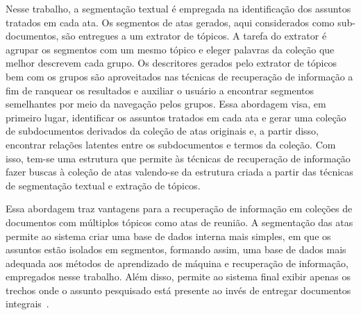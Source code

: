 Nesse trabalho, a segmentação textual é empregada na identificação dos assuntos tratados em cada ata. Os segmentos de atas gerados, aqui considerados como sub-documentos, são entregues a um extrator de tópicos. A tarefa do extrator é agrupar os segmentos com um mesmo tópico e eleger palavras da coleção que melhor descrevem cada grupo. Os descritores gerados pelo extrator de tópicos bem com os grupos são aproveitados nas técnicas de recuperação de informação a fim de ranquear os resultados e auxiliar o usuário a encontrar segmentos semelhantes por meio da navegação pelos grupos. Essa abordagem visa, em primeiro lugar, identificar os assuntos tratados em cada ata e gerar uma coleção de subdocumentos derivados da coleção de atas originais e, a partir disso, encontrar relações latentes entre os subdocumentos e termos da coleção. Com isso, tem-se uma estrutura que permite às técnicas de recuperação de informação fazer buscas à coleção de atas valendo-se da estrutura criada a partir das técnicas de segmentação textual e extração de tópicos. 









%
%
Essa abordagem traz vantagens para a recuperação de informação em coleções de documentos com múltiplos tópicos como atas de reunião.
A segmentação das atas permite ao sistema criar uma base de dados interna mais simples, em que os assuntos estão isolados em segmentos, formando assim, uma base de dados mais adequada aos métodos de aprendizado de máquina e recuperação de informação, empregados nesse trabalho. Além disso, permite ao sistema final exibir apenas os trechos onde o assunto pesquisado está presente ao invés de entregar documentos integrais~\cite{Tagarelli2013, Jeong:2010, Prince2007, Huang2003}. 
%



